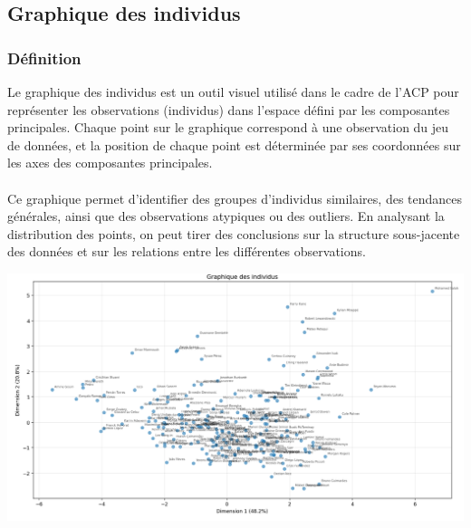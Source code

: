 \documentclass[12pt]{scrartcl}
\begin{document}

        \subsection{Graphique des individus}
            \subsubsection{Définition}
                Le graphique des individus est un outil visuel utilisé dans le cadre de l'ACP pour représenter les observations (individus) dans l'espace défini par les composantes principales. Chaque point sur le graphique correspond à une observation du jeu de données, et la position de chaque point est déterminée par ses coordonnées sur les axes des composantes principales.\\\\
                Ce graphique permet d'identifier des groupes d'individus similaires, des tendances générales, ainsi que des observations atypiques ou des outliers. En analysant la distribution des points, on peut tirer des conclusions sur la structure sous-jacente des données et sur les relations entre les différentes observations.\\

                \begin{center}
                    \includegraphics[width=1\textwidth]{images/graphique_des_individus.png}
                \end{center}
\end{document}
